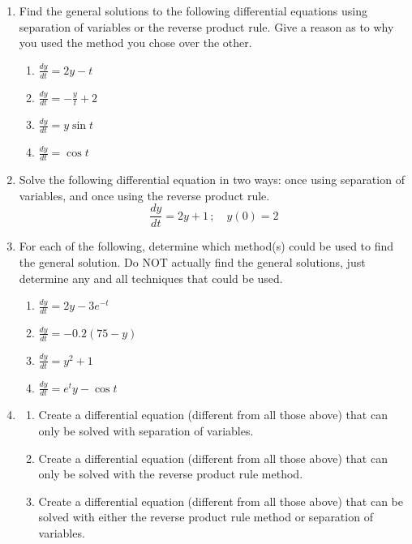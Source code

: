 \begin{enumerate}
\item Find the general solutions to the following differential equations using separation of variables or the reverse product rule.  Give a reason as to why you used the method you chose over the other. \label{04HWproblem1}

\begin{enumerate}
\item $\displaystyle \frac{dy}{dt}=2y-t$
\item $\displaystyle \frac{dy}{dt}=-\frac{y}{t}+2$
\item $\displaystyle \frac{dy}{dt}=y\sin t$
\item $\displaystyle \frac{dy}{dt}=\cos t$	
\end{enumerate}

\item Solve the following differential equation in two ways: once using separation of variables, and once using the reverse product rule. \label{04HWproblem2} 
\[ \frac{dy}{dt} = 2y+1\, ; \quad y(0)=2\]

\item	For each of the following, determine which method(s) could be used to find the general solution. Do NOT actually find the general solutions, just determine any and all techniques that could be used. \label{04HWproblem3}

\begin{enumerate}
\item $\displaystyle \frac{dy}{dt}=2y-3e^{-t}$
\item $\displaystyle \frac{dy}{dt}=-0.2(75-y)$
\item $\displaystyle \frac{dy}{dt}=y^2+1$
\item $\displaystyle \frac{dy}{dt}=e^t y-\cos t$
\end{enumerate}

\item \label{04HWproblem4}
\begin{enumerate}
\item Create a differential equation (different from all those above) that can only be solved with separation of variables.
\item	Create a differential equation (different from all those above) that can only be solved with the reverse product rule method.
\item	Create a differential equation (different from all those above) that can be solved with either the reverse product rule method or separation of variables.
\end{enumerate}


\end{enumerate}
